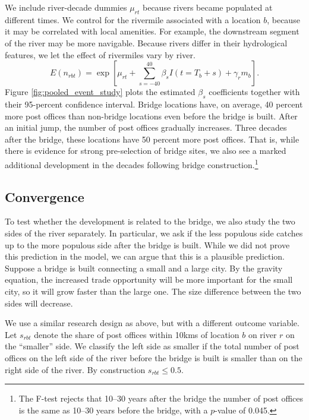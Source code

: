 We include river-decade dummies $\mu_{rt}$ because rivers became populated at different times. We control for the rivermile associated with a location $b$, because it may be correlated with local amenities. For example, the downstream segment of the river may be more navigable. Because rivers differ in their hydrological features, we let the effect of rivermiles vary by river.
\begin{equation}
\label{eq:poisson}
E ({n_{rbt}})
		 = \exp
		 \left[\mu_{rt}+\sum_{s=-40}^{40}\beta_s I(t=T_b+s) + \gamma_r m_{b}\right].
\end{equation}
Figure \ref{fig:pooled_event_study} plots the estimated $\beta_s$ coefficients together with their 95-percent confidence interval. Bridge locations have, on average, 40 percent more post offices than non-bridge locations even before the bridge is built. After an initial jump, the number of post offices gradually increases. Three decades after the bridge, these locations have 50 percent more post offices. That is, while there is evidence for strong pre-selection of bridge sites, we also see a marked additional development in the decades following bridge construction.\footnote{The F-test rejects that 10--30 years after the bridge the number of post offices is the same as 10--30 years before the bridge, with a $p$-value of 0.045.}


\subsection{Convergence}
To test whether the development is related to the bridge, we also study the two sides of the river separately. In particular, we ask if the less populous side catches up to the more populous side after the bridge is built. While we did not prove this prediction in the model, we can argue that this is a plausible prediction. Suppose a bridge is built connecting a small and a large city. By the gravity equation, the increased trade opportunity will be more important for the small city, so it will grow faster than the large one. The size difference between the two sides will decrease.

We use a similar research design as above, but with a different outcome variable. Let $s_{rbt}$ denote the share of post offices within 10kms of location $b$ on river $r$ on the ``smaller'' side. We classify the left side as smaller if the total number of post offices on the left side of the river before the bridge is built is smaller than on the right side of the river. By construction $s_{rbt}\le 0.5$.

